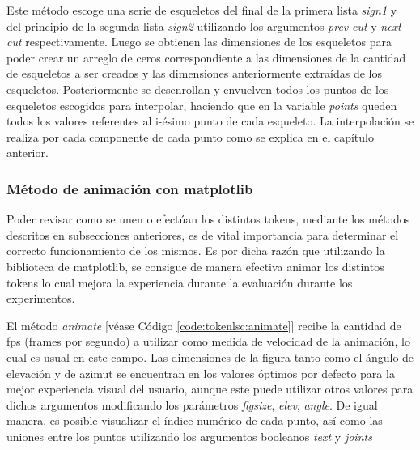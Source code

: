 Este método escoge una serie de esqueletos del final de la primera lista \textit{sign1} y del principio de la segunda lista \textit{sign2} utilizando los argumentos \textit{prev$\_$cut} y \textit{next$\_$cut} respectivamente. Luego se obtienen las dimensiones de los esqueletos para poder crear un arreglo de ceros correspondiente a las dimensiones de la cantidad de esqueletos a ser creados y las dimensiones anteriormente extraídas de los esqueletos. Posteriormente se desenrollan y envuelven todos los puntos de los esqueletos escogidos para interpolar, haciendo que en la variable \textit{points} queden todos los valores referentes al i-ésimo punto de cada esqueleto. La interpolación se realiza por cada componente de cada punto como se explica en el capítulo anterior. 

\subsubsection{Método de animación con matplotlib}
Poder revisar como se unen o efectúan los distintos tokens, mediante los métodos descritos en subsecciones anteriores, es de vital importancia para determinar el correcto funcionamiento de los mismos. Es por dicha razón que utilizando la biblioteca de matplotlib, se consigue de manera efectiva animar los distintos tokens lo cual mejora la experiencia durante la evaluación durante los experimentos.

El método \textit{animate} [véase Código \ref{code:tokenlsc:animate}] recibe la cantidad de fps (frames por segundo) a utilizar como medida de velocidad de la animación, lo cual es usual en este campo. Las dimensiones de la figura tanto como el ángulo de elevación y de azimut se encuentran en los valores óptimos por defecto para la mejor experiencia visual del usuario, aunque este puede utilizar otros valores para dichos argumentos modificando los parámetros \textit{figsize}, \textit{elev}, \textit{angle}. De igual manera, es posible visualizar el índice numérico de cada punto, así como las uniones entre los puntos utilizando los argumentos booleanos \textit{text} y \textit{joints}

